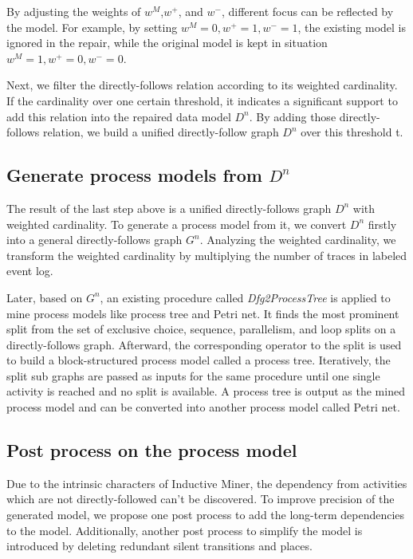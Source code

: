 By adjusting the weights of $w^{M}$,$w^{+}$, and $w^{-}$, different focus can be reflected by the model. For example, by setting $w^{M}=0, w^{+}=1,w^{-}=1$, the existing model is ignored in the repair, while  the original model is kept in situation $w^{M}=1, w^{+}=0,w^{-}=0$.

Next, we filter the directly-follows relation according to its weighted cardinality. If the cardinality over one certain threshold, it indicates a significant support to add this relation into the repaired data model $D^n$. By adding those directly-follows relation, we build a unified directly-follow graph $D^n$ over this threshold t. 
\subsection{Generate process models from $D^n$}
The result of the last step above is a unified directly-follows graph $D^n$ with weighted cardinality. To generate a process model from it, we convert $D^n$ firstly into a general directly-follows graph $G^n$. Analyzing the weighted cardinality, we transform the weighted cardinality by multiplying the number of traces in labeled event log.


Later, based on $G^n$, an existing procedure called \emph{Dfg2ProcessTree} is applied to mine process models like process tree and Petri net\cite{leemans2013discovering}. It finds the most prominent split from the set of exclusive choice, sequence, parallelism, and loop splits on  a directly-follows graph.  Afterward, the corresponding operator to the split is used to build a block-structured process model called a process tree. Iteratively, the split sub graphs are passed as inputs for the same procedure until one single activity is reached and no split is available. A process tree is output as the mined process model and can be converted into another process model called Petri net.
\subsection{Post process on the process model}
Due to the intrinsic characters of Inductive Miner, the dependency from activities which are not directly-followed can't be discovered. To improve precision of the generated model, we propose one post process to add the long-term dependencies to the model. Additionally, another post process to simplify the model is introduced by deleting redundant silent transitions and places.
